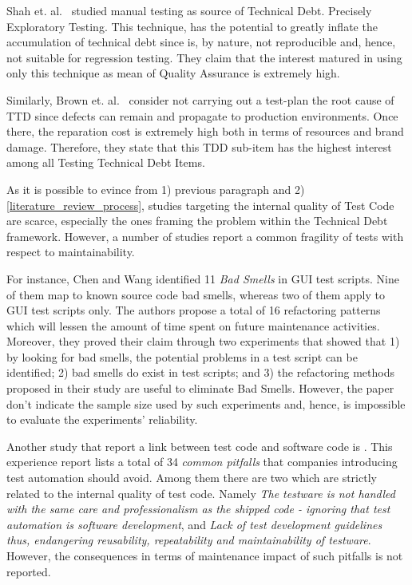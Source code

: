 Shah et. al.\ \cite{exploratorying_testing_td} studied manual testing as source of Technical Debt. Precisely Exploratory Testing. This technique, has the potential to greatly inflate the accumulation of technical debt since is, by nature, not reproducible and, hence, not suitable for regression testing. They claim that the interest matured in using only this technique as mean of Quality Assurance is extremely high. 

Similarly, Brown et. al.\ \cite{td_current_vs_optimal_quality} consider not carrying out a test-plan the root cause of TTD since defects can remain and propagate to production environments. Once there, the reparation cost is extremely high both in terms of resources and brand damage. Therefore, they state that this TDD sub-item has the highest interest among all Testing Technical Debt Items.

As it is possible to evince from 1) previous paragraph and 2) \ref{literature_review_process}, studies targeting the internal quality of Test Code are scarce, especially the ones framing the problem within the Technical Debt framework. However, a number of studies report a common fragility of tests with respect to maintainability. 

For instance, Chen and Wang \cite{gui_scripts_bad_smells} identified 11 \textit{Bad Smells} in GUI test scripts. Nine of them map to known source code bad smells, whereas two of them apply to GUI test scripts only. The authors propose a total of 16 refactoring patterns which will lessen the amount of time spent on future maintenance activities. Moreover, they proved their claim through two experiments that showed that 1) by looking for bad smells, the potential problems in a test script can be identified; 2) bad smells do exist in test scripts; and 3) the refactoring methods proposed in their study are useful to eliminate Bad Smells. However, the paper don't indicate the sample size used by such experiments and, hence, is impossible to evaluate the experiments' reliability. 

Another study that report a link between test code and software code is \cite{pitfalls_in_introducing_regression_testing}. This experience report lists a total of 34 \textit{common pitfalls} that companies introducing test automation should avoid. Among them there are two which are strictly related to the internal quality of test code. Namely \textit{The testware is not handled with the same care and professionalism as the shipped code - ignoring that test automation is software development}, and \textit{Lack of test development guidelines thus, endangering reusability, repeatability and maintainability of testware}. However, the consequences in terms of maintenance impact of such pitfalls is not reported. 

